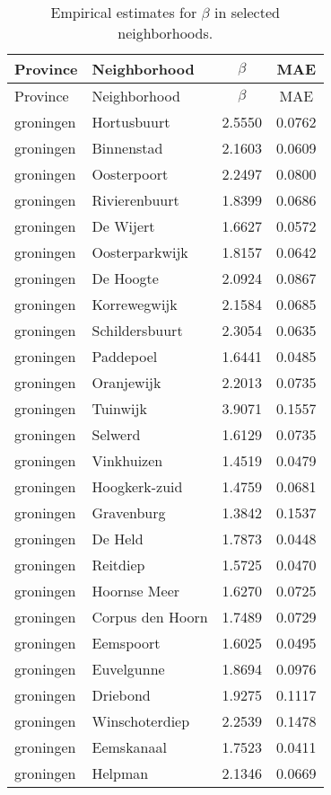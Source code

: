 \begin{longtable}{llcc}
\caption{Empirical estimates for $\beta$ in selected neighborhoods.} \label{tab:results}\\
\hline
Province & Neighborhood & $\beta$ & MAE \\
\hline
\endfirsthead
\hline
Province & Neighborhood & $\beta$ & MAE \\
\hline
\endhead
groningen & Hortusbuurt & 2.5550 & 0.0762 \\
groningen & Binnenstad & 2.1603 & 0.0609 \\
groningen & Oosterpoort & 2.2497 & 0.0800 \\
groningen & Rivierenbuurt & 1.8399 & 0.0686 \\
groningen & De Wijert & 1.6627 & 0.0572 \\
groningen & Oosterparkwijk & 1.8157 & 0.0642 \\
groningen & De Hoogte & 2.0924 & 0.0867 \\
groningen & Korrewegwijk & 2.1584 & 0.0685 \\
groningen & Schildersbuurt & 2.3054 & 0.0635 \\
groningen & Paddepoel & 1.6441 & 0.0485 \\
groningen & Oranjewijk & 2.2013 & 0.0735 \\
groningen & Tuinwijk & 3.9071 & 0.1557 \\
groningen & Selwerd & 1.6129 & 0.0735 \\
groningen & Vinkhuizen & 1.4519 & 0.0479 \\
groningen & Hoogkerk-zuid & 1.4759 & 0.0681 \\
groningen & Gravenburg & 1.3842 & 0.1537 \\
groningen & De Held & 1.7873 & 0.0448 \\
groningen & Reitdiep & 1.5725 & 0.0470 \\
groningen & Hoornse Meer & 1.6270 & 0.0725 \\
groningen & Corpus den Hoorn & 1.7489 & 0.0729 \\
groningen & Eemspoort & 1.6025 & 0.0495 \\
groningen & Euvelgunne & 1.8694 & 0.0976 \\
groningen & Driebond & 1.9275 & 0.1117 \\
groningen & Winschoterdiep & 2.2539 & 0.1478 \\
groningen & Eemskanaal & 1.7523 & 0.0411 \\
groningen & Helpman & 2.1346 & 0.0669 \\

\end{longtable}
